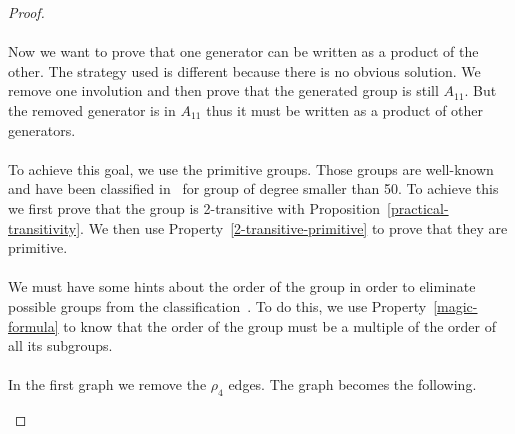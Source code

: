 \begin{proof}
\begin{figure}[H]
\begin{center}
\begin{tikzpicture}[scale=.8]
    \end{tikzpicture}
    \caption{}
  \end{center}
\end{figure}

\paragraph{}
Now we want to prove that one generator can be written as a product of the other. The strategy used is different because there is no obvious solution. We remove one involution and then prove that the generated group is still $A_{11}$. But the removed generator is in $A_{11}$ thus it must be written as a product of other generators.

\paragraph{}
To achieve this goal, we use the primitive groups. Those groups are well-known and have been classified in~\cite{buekenhout1996list} for group of degree smaller than 50. To achieve this we first prove that the group is 2-transitive with Proposition~\ref{practical-transitivity}. We then use Property~\ref{2-transitive-primitive} to prove that they are primitive.

\paragraph{}
We must have some hints about the order of the group in order to eliminate possible groups from the classification~\cite{buekenhout1996list}. To do this, we use Property~\ref{magic-formula} to know that the order of the group must be a multiple of the order of all its subgroups.

\paragraph{}
In the first graph we remove the $\rho_4$ edges. The graph becomes the following.

\begin{figure}[H]
  \begin{center}
\end{center}
\end{figure}
\end{proof}
